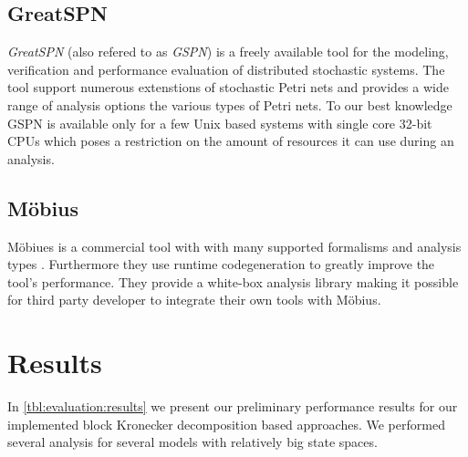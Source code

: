 \subsection{GreatSPN}

\emph{GreatSPN} (also refered to as \emph{GSPN}) \citep{baarir2009greatspn} is a freely available tool for the modeling, verification and performance evaluation of distributed stochastic systems. The tool support numerous extenstions of stochastic Petri nets and provides a wide range of analysis options the various types of Petri nets. To our best knowledge GSPN is available only for a few Unix based systems with single core 32-bit CPUs which poses a restriction on the amount of resources it can use during an analysis.

\subsection{Möbius}

Möbiues is a commercial tool with with many supported formalisms and analysis types \citep{courtney2009mobius}. Furthermore they use runtime codegeneration to greatly improve the tool's performance. They provide a white-box analysis library making it possible for third party developer to integrate their own tools with Möbius.

\section{Results}
\label{sec:evaluation:results}

In \cref{tbl:evaluation:results} we present our preliminary performance results for our implemented block Kronecker decomposition based approaches. We performed several analysis for several models with relatively big state spaces. 